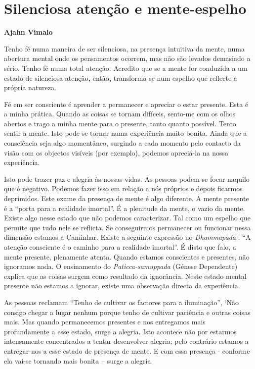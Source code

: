 \chapter{Silenciosa atenção e mente-espelho}

\textbf{Ajahn Vimalo}

Tenho fé numa maneira de ser silenciosa, na presença intuitiva da mente,
numa abertura mental onde os pensamentos ocorrem, mas não são levados
demasiado a sério. Tenho fé numa total atenção. Acredito que se a mente
for conduzida a um estado de silenciosa atenção\textbf{,}
então\textbf{,} transforma-se num espelho que reflecte a própria
natureza.

Fé em ser consciente é aprender a permanecer e apreciar o estar
presente. Esta é a minha prática. Quando as coisas se tornam difíceis,
sento-me com os olhos abertos e trago a minha mente para o presente,
tanto quanto possível. Tento sentir a mente. Isto pode-se tornar numa
experiência muito bonita. Ainda que a consciência seja algo momentâneo,
surgindo a cada momento pelo contacto da visão com os objectos visíveis
(por exemplo), podemos apreciá-la na nossa experiência.

Isto pode trazer paz e alegria às nossas vidas. As pessoas podem-se
focar naquilo que é negativo. Podemos fazer isso em relação a nós
próprios e depois ficarmos deprimidos. Este exame da presença de mente é
algo diferente. A mente presente é a ``porta para a realidade imortal''.
É a plenitude da mente, o vazio da mente. Existe algo nesse estado que
não podemos caracterizar. Tal como um espelho que permite que tudo nele
se reflicta. Se conseguirmos permanecer ou funcionar nessa dimensão
estamos a Caminhar. Existe a seguinte expressão no \emph{Dhammapada} :
``A atenção consciente é o caminho para a realidade imortal''. É disto
que falo, a mente presente, plenamente atenta. Quando estamos
conscientes e presentes, não ignoramos nada. O ensinamento do
\emph{Paticca-samuppada} (Génese Dependente) explica que as coisas
surgem como resultado da ignorância. Neste estado mental presente não
estamos a ignorar, existe uma observação directa da experiência.

As pessoas reclamam ``Tenho de cultivar os factores para a iluminação'',
`Não consigo chegar a lugar nenhum porque tenho de cultivar paciência e
outras coisas mais. Mas quando permanecemos presentes e nos entregamos
mais profundamente a esse estado, surge a alegria. Isto acontece não por
estarmos intensamente concentrados a tentar desenvolver alegria; pelo
contrário estamos a entregar-nos a esse estado de presença de mente. E
com essa presença - conforme ela vai-se tornando mais bonita -- surge a
alegria.

